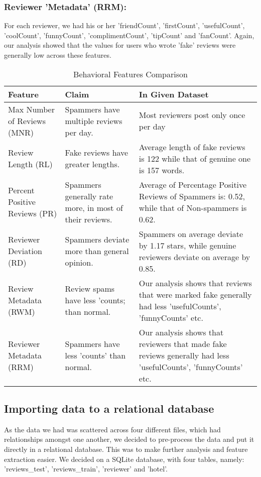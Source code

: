 \documentclass{llncs}
\begin{document}
\subsubsection{Reviewer 'Metadata' (RRM):}
%
For each reviewer, we had his or her 'friendCount', 'firstCount', 'usefulCount', 'coolCount', 'funnyCount', 'complimentCount', 'tipCount' and 'fanCount'. Again, our analysis showed that the values for users who wrote 'fake' reviews were generally low across these features.
%
\begin{table}[h]
	\caption{Behavioral Features Comparison}
	\begin{tabular}{ |p{3cm}|p{4cm}| p{4cm}|}
		\hline
		Feature                        &Claim                  &In Given Dataset\\
		\hline
		Max Number of Reviews (MNR)     &Spammers have multiple reviews per day.  &Most reviewers post only once per day\\
		\hline
		Review Length (RL)  &Fake reviews have greater lengths.   &Average length of fake reviews is 122 while that of genuine one is 157 words.\\
		\hline
		Percent Positive Reviews (PR)   &Spammers generally rate more, in most of their reviews.   &Average of Percentage Positive Reviews of Spammers is: 0.52, while that of Non-spammers is 0.62.\\
		\hline
		Reviewer Deviation (RD)               &Spammers deviate more than general opinion.     &Spammers on average deviate by 1.17 stars, while genuine reviewers deviate on average by 0.85.\\
		\hline
		Review Metadata (RWM)               &Review spams have less 'counts; than normal.     &Our analysis shows that reviews that were marked fake generally had less 'usefulCounts', 'funnyCounts' etc.\\
		\hline
		Reviewer Metadata (RRM)               &Spammers have less 'counts' than normal.     &Our analysis shows that reviewers that made fake reviews generally had less 'usefulCounts', 'funnyCounts' etc.\\
		\hline
	\end{tabular}
	\label{table}
\end{table}
\subsection{Importing data to a relational database}
As the data we had was scattered across four different files, which had relationships amongst one another, we decided to pre-process the data and put it directly in a relational database. This was to make further analysis and feature extraction easier. We decided on a SQLite database, with four tables, namely: 'reviews\_test', 'reviews\_train', 'reviewer' and 'hotel'. 
\end{document}
